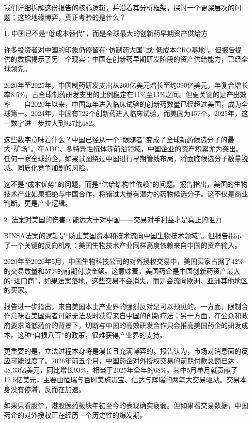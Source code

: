 \documentclass[11pt]{ctexart}
\begin{document}
我们详细拆解这份报告的核心逻辑，并沿着其分析框架，探讨一个更深层次的问题：这轮地缘博弈，真正考验的是什么？

1. 中国已不是“低成本替代”，而是全球最大的创新药早期资产供给方

许多投资者对中国的印象仍停留在“仿制药大国”或“低成本CRO基地”。但报告提供的数据揭示了另一个现实：中国在创新药早期研发阶段的资产供给能力，已经全球领先。

2020年至2025年，中国制药研发支出从260亿美元增长至约390亿美元，年复合增长率8.5\%，占全球制药研发支出的比例稳定在11\%至13\%之间。但更关键的是产出效率——自2020年以来，中国每年进入临床试验的创新药数量已经超过美国，成为全球第一。2024年，中国有722个创新药进入临床试验，而美国为457个。2025年，这一数字进一步拉大到827比482。

这些数字意味着什么？中国已经从一个“跟随者”变成了全球新药候选分子的最大“矿场”。在ADC、多特异性抗体等前沿领域，中国企业的资产积累尤为突出。任何一家全球药企，如果试图绕过中国进行早期管线布局，将面临候选分子数量锐减、同质化竞争加剧的风险。

这不是“成本优势”的问题，而是“供给结构性依赖”的问题。报告指出，美国的生物技术产业如果拒绝与中国合作，将错过大量有潜力的药物候选分子。这不仅是商业判断，更是产业逻辑。

2. 法案对美国的伤害可能远大于对中国——交易对手利益才是真正的阻力

BINSA法案的逻辑是“防止美国资本和技术流向中国生物技术领域”。但报告揭示了一个关键的反向机制：美国生物技术产业同样高度依赖来自中国的资产输入。

2020年至2026年5月，中国生物科技公司的对外授权交易中，美国买家占据了42\%的交易数量和57\%的前期付款金额。这意味着，美国药企是中国创新药资产最大的“进口商”。如果法案落地，这些交易不会消失，而是会流向欧洲、亚洲其他地区的买家。

报告进一步指出，来自美国本土产业界的强烈反对是可以预见的。一方面，限制合作意味着美国患者可能无法及时获得来自中国的创新疗法；另一方面，在公众和政府要求降低药价的背景下，切断与中国的高效研发合作只会推高美国药企的研发成本。这种“自损八百”的政策，很难获得产业界的支持。

更重要的是，立法过程本身将是漫长且充满博弈的。报告认为，市场对消息面的反应可能过度了。2026年前五个月，中国药企对外授权交易的前期付款总额已达48.33亿美元，同比增长93\%，相当于2025年全年的68\%。其中5月单月就贡献了12.5亿美元，主要由恒瑞与百时美施贵宝、信达与辉瑞的两笔大交易驱动。交易本身没有停滞，反而在加速。

如果只看股价，港股医药板块年初至今的表现确实疲弱。但如果看交易数据，中国药企的对外授权正在经历一个历史性的爆发期。
\end{document}
